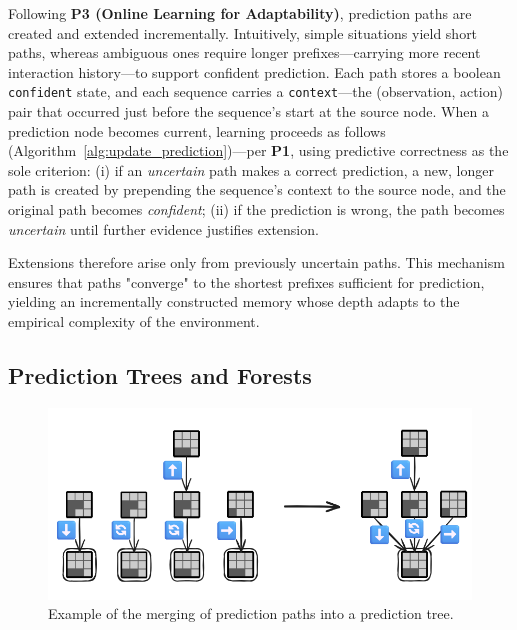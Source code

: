 \documentclass[11pt]{article}
\begin{document}
Following \textbf{P3 (Online Learning for Adaptability)}, prediction paths are created and extended incrementally. Intuitively, simple situations yield short paths, whereas ambiguous ones require longer prefixes—carrying more recent interaction history—to support confident prediction. Each path stores a boolean \texttt{confident} state, and each sequence carries a \texttt{context}—the (observation, action) pair that occurred just before the sequence’s start at the source node. When a prediction node becomes current, learning proceeds as follows (Algorithm~\ref{alg:update_prediction})—per \textbf{P1}, using predictive correctness as the sole criterion: (i) if an \emph{uncertain} path makes a correct prediction, a new, longer path is created by prepending the sequence’s context to the source node, and the original path becomes \emph{confident}; (ii) if the prediction is wrong, the path becomes \emph{uncertain} until further evidence justifies extension.

Extensions therefore arise only from previously uncertain paths. This mechanism ensures that paths "converge" to the shortest prefixes sufficient for prediction, yielding an incrementally constructed memory whose depth adapts to the empirical complexity of the environment.

\subsection{Prediction Trees and Forests}

\begin{figure}[ht]
\centering
\includegraphics[width=0.8\linewidth]{img/prediction_paths_to_tree.png}
\caption{Example of the merging of prediction paths into a prediction tree.}
\label{fig:paths_to_tree}
\end{figure}
\end{document}
